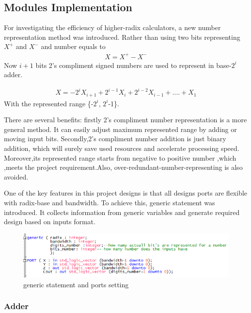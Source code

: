\documentclass[10pt]{article}
\begin{document}
\subsection{Modules Implementation}

For investigating the efficiency of higher-radix calculators, a new number representation method was introduced. Rather than using two bits representing $X^+$ and $X^-$ and number equals to
\begin{gather}
    X = X^+-X^-
\end{gather}
    Now $i+1$ bits 2's compliment signed numbers are used to represent in base-$2^{i}$ adder.
    
\begin{gather}
    X = -2^{i}X_{i+1}+2^{i-1}X_{i}+2^{i-2}X_{i-1}+....+X_1
\end{gather}
 With the represented range \{-$2^i$, $2^i$-1\}.  
 
 There are several benefits: firstly 2's compliment number representation is a more general method. It can easily adjust maximum represented range by adding or moving input bits. Secondly,2's compliment number addition is just binary addition, which will surely save used resources and accelerate processing speed. Moreover,its represented range starts from negative to positive number ,which ,meets the project requirement.Also, over-redundant-number-representing is also avoided. 
 
 One of the key features in this project designs is that all designs ports are flexible with radix-base and bandwidth. To achieve this, generic statement was introduced. It collects information from generic variables and generate required design based on inputs format.
 
 
         \begin{figure}[H]
       \centering
       \includegraphics[scale=0.75]{code_generic.PNG}
       \caption{generic statement and ports setting}
    \end{figure}

\subsubsection{Adder}
\end{document}
